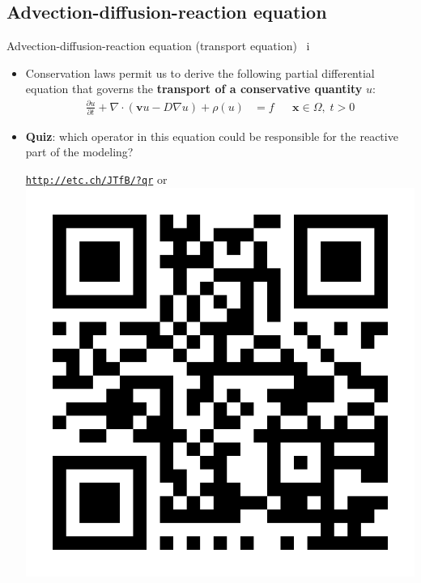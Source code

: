 \subsection{Advection-diffusion-reaction equation}
\begin{frame}{Advection-diffusion-reaction equation (transport equation) \, i}
\begin{itemize}
\item Conservation laws permit us to derive the following partial differential
equation that governs the {\bf transport of a conservative quantity} $u$:
%
{
	\small
	\begin{align*}
		\frac{\partial u}{\partial t}+\nabla\cdot(\boldsymbol{v}u-D\nabla u) + \rho (u) & =f &  & \boldsymbol{x}\in\Omega,\;t>0
	\end{align*}
}
%
	\item \alert{\bf Quiz}: which operator in this equation could be responsible for the reactive part of the modeling?
	\begin{center}
		\href{http://etc.ch/JTfB/?qr}{\textcolor{indigo(dye)}{\tt http://etc.ch/JTfB/?qr}} \quad or \quad 
		\includegraphics[height=0.2\columnwidth]{figures/reactive-transport/polls.png}
	\end{center}
%

\end{itemize}
\end{frame}

